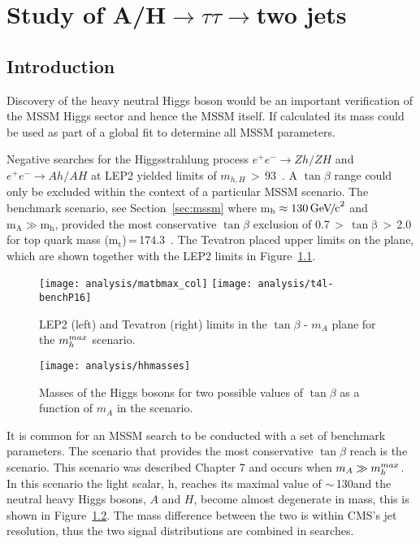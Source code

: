 \chapter{Study of A/H$\rightarrow\tau\tau\rightarrow$two jets}

\section{Introduction}
Discovery of the heavy neutral Higgs boson would be an important verification of the MSSM Higgs sector and hence the MSSM itself. If calculated its mass could be used as part of a global fit to determine all MSSM parameters. 

Negative searches for the Higgsstrahlung process $e^{+}e^{-} \rightarrow Zh/ZH$ and $e^{+}e^{-} \rightarrow Ah/AH$ at LEP2 yielded limits of $m_{h,H}$\,$>$\,93\GeVcc~\cite{Schael:2006cr}. A $\tan{\beta}$ range could only be excluded within the context of a particular MSSM scenario. The \mhmax benchmark scenario, see Section~\ref{sec:mssm} where m$\mathrm{_h \approx 130{\,\mathrm{Ge\hspace{-.08em}V\hspace{-0.16em}/\hspace{-0.08em}c}^\mathrm{2}}}$ and $\mathrm{m_A \gg m_h}$, provided the most conservative $\tan{\beta}$ exclusion of 0.7\,$>$\,$\mathrm{\tan{\beta}}$\,$>$\,2.0 for top quark mass ($\mathrm{m_{t}}$)\,=\,174.3\GeVcc~\cite{Schael:2006cr}. The Tevatron placed upper limits on the \plane plane, which are shown together with the LEP2 limits in Figure~\ref{fig:lep_limit}.

\begin{figure}[htb]
\centering
\texttt{[image: analysis/matbmax\_col]}
\texttt{[image: analysis/t4l-benchP16]}
\caption{LEP2 (left) and Tevatron (right) limits in the $\tan{\beta}$ - $m_{A}$ plane for the $m_{h}^{max}$ scenario.~\cite{Schael:2006cr, citeulike:894146}  
\label{fig:lep_limit}}
\end{figure}

\begin{figure}[htb]
\centering
\texttt{[image: analysis/hhmasses]}
\caption{Masses of the Higgs bosons for two possible values of $\tan{\beta}$ as a function of $m_{A}$ in the \mhmax scenario.~\cite{citeulike:888485}  
\label{fig:Higgs_degenerate}}
\end{figure}

It is common for an MSSM search to be conducted with a set of benchmark parameters. The scenario that provides the most conservative $\tan{\beta}$ reach is the \mhmax scenario. This scenario was described Chapter 7 and occurs when $m_A \gg m_{h}^{max}$. In this scenario the light scalar, h, reaches its maximal value of $\sim$\,130\GeVcc and the neutral heavy Higgs bosons, $A$ and $H$, become almost degenerate in mass, this is shown in Figure~\ref{fig:Higgs_degenerate}. The mass difference between the two is within CMS's jet resolution, thus the two signal distributions are combined in searches.

